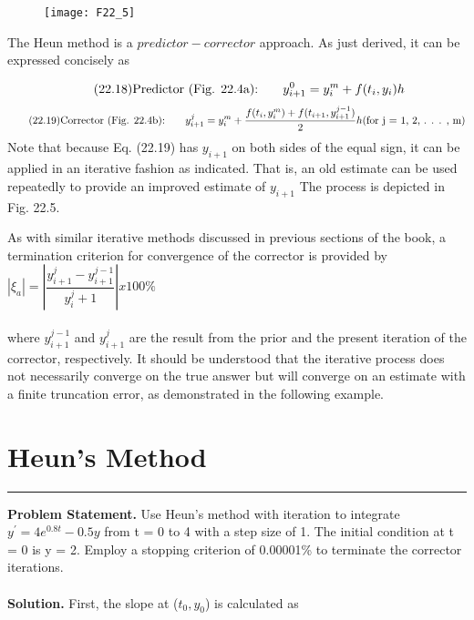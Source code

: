 \documentclass[../main.tex]{subfiles}
\begin{document}
\begin{figure}[hbt!]
	\texttt{[image: F22\_5]}
	\label{F22.5}
\end{figure}

The Heun method is a $predictor-corrector$ approach. As just derived, it can be expressed concisely as

\begin{equation}
\tag{22.18}
\textnormal{Predictor (Fig. 22.4a):} \; \; \; \; \; \; \; y^{0}_{i+1} = y^{m}_{i} + f(t_{i}, y_{i})h
\end{equation}
\begin{equation}
\tag{22.19}
\textnormal{Corrector (Fig. 22.4b):} \; \; \; \; \; \; \; y^{j}_{i+1} = y^{m}_{i} + \dfrac{ f(t_{i},y^{m}_{i}) + f(t_{i+1},y^{j-1}_{i+1}) }{ 2 }h
\textnormal{(for j = 1, 2, . . . , m)}
\end{equation}
Note that because Eq. (22.19) has $y_{i+1}$ on both sides of the equal sign, it can be applied in
an iterative fashion as indicated. That is, an old estimate can be used repeatedly to provide
an improved estimate of $y_{i+1}$ The process is depicted in Fig. 22.5.

As with similar iterative methods discussed in previous sections of the book, a termination criterion for convergence of the corrector is provided by
\\

$|\xi_{a}| = \left| \dfrac{y^{j}_{i+1} - y^{j-1}_{i+1}}{y^{j}_i+1} \right| x 100\% $
\\
\\
where $y^{j-1}_{i+1}$ and $y^{j}_{i+1}$ are the result from the prior and the present iteration of the corrector,
respectively. It should be understood that the iterative process does not necessarily converge on the true answer but will converge on an estimate with a finite truncation error, as
demonstrated in the following example.\\

\vspace{0,3in}
\section{Heun's Method}
\vspace{0,1in}
\hrule
\vspace{0,1in}
\textbf{Problem Statement.} Use Heun's method with iteration to integrate $y^{'} = 4e^{0.8t} - 0.5y$ from t = 0 to 4 with a step size of 1. The initial condition at t = 0 is y = 2. Employ a stopping criterion of 0.00001\% to terminate the corrector iterations.
\\
\vspace{0.2in}\\
\textbf{Solution.} First, the slope at ($t_{0}, y_{0}$) is calculated as\\
\end{document}
